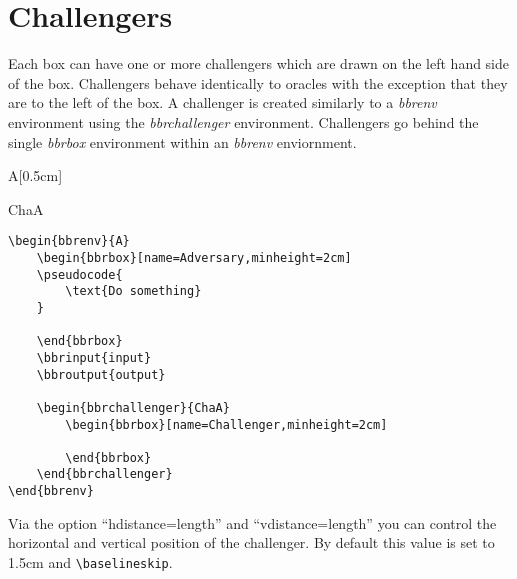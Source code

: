\documentclass[a4paper]{report}
\begin{document}
\section{Challengers}
Each box can have one or more challengers which are drawn on the left hand side of the box. Challengers
behave identically to oracles with the exception that they are to the left of the box. A challenger
is created similarly to a \emph{bbrenv} environment using the \emph{bbrchallenger} environment. Challengers
go behind the single \emph{bbrbox} environment within an \emph{bbrenv} enviornment.

\begin{bbrenv}[1cm]{A}[0.5cm]
	\begin{bbrbox}[name=Adversary,minheight=2cm]

	\end{bbrbox}

	\begin{bbrchallenger}{ChaA}
		\begin{bbrbox}[name=Challenger,minheight=2cm]

		\end{bbrbox}
	\end{bbrchallenger}
\end{bbrenv}


\begin{lstlisting}
\begin{bbrenv}{A}
	\begin{bbrbox}[name=Adversary,minheight=2cm]
	\pseudocode{
		\text{Do something}
	}

	\end{bbrbox}
	\bbrinput{input}
	\bbroutput{output}

	\begin{bbrchallenger}{ChaA}
		\begin{bbrbox}[name=Challenger,minheight=2cm]

		\end{bbrbox}
	\end{bbrchallenger}
\end{bbrenv}
\end{lstlisting}
Via the option \enquote{hdistance=length} and \enquote{vdistance=length} you can control the horizontal and vertical position of the challenger. By default this value is set to 1.5cm and \lstinline$\baselineskip$.
\end{document}
